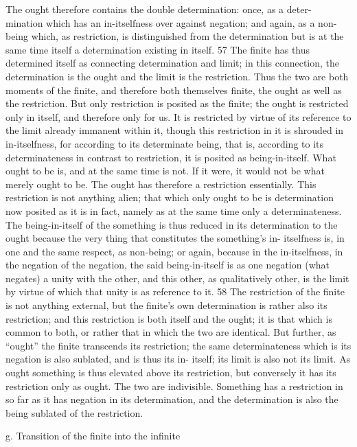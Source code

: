 The ought therefore contains the double determination: once, as a deter-
mination which has an in-itselfness over against negation; and again, as a
non-being which, as restriction, is distinguished from the determination
but is at the same time itself a determination existing in itself. 57
The finite has thus determined itself as connecting determination and
limit; in this connection, the determination is the ought and the limit is the
restriction. Thus the two are both moments of the finite, and therefore both
themselves finite, the ought as well as the restriction. But only restriction is
posited as the finite; the ought is restricted only in itself, and therefore only
for us. It is restricted by virtue of its reference to the limit already immanent
within it, though this restriction in it is shrouded in in-itselfness, for
according to its determinate being, that is, according to its determinateness
in contrast to restriction, it is posited as being-in-itself.
What ought to be is, and at the same time is not. If it were, it would
not be what merely ought to be. The ought has therefore a restriction
essentially. This restriction is not anything alien; that which only ought to
be is determination now posited as it is in fact, namely as at the same time
only a determinateness.
The being-in-itself of the something is thus reduced in its determination
to the ought because the very thing that constitutes the something’s in-
itselfness is, in one and the same respect, as non-being; or again, because
in the in-itselfness, in the negation of the negation, the said being-in-itself
is as one negation (what negates) a unity with the other, and this other, as
qualitatively other, is the limit by virtue of which that unity is as reference
to it. 58 The restriction of the finite is not anything external, but the finite’s
own determination is rather also its restriction; and this restriction is both
itself and the ought; it is that which is common to both, or rather that in
which the two are identical.
But further, as “ought” the finite transcends its restriction; the same
determinateness which is its negation is also sublated, and is thus its in-
itself; its limit is also not its limit.
As ought something is thus elevated above its restriction, but conversely
it has its restriction only as ought. The two are indivisible. Something has
a restriction in so far as it has negation in its determination, and the
determination is also the being sublated of the restriction.

g. Transition of the finite into the infinite

